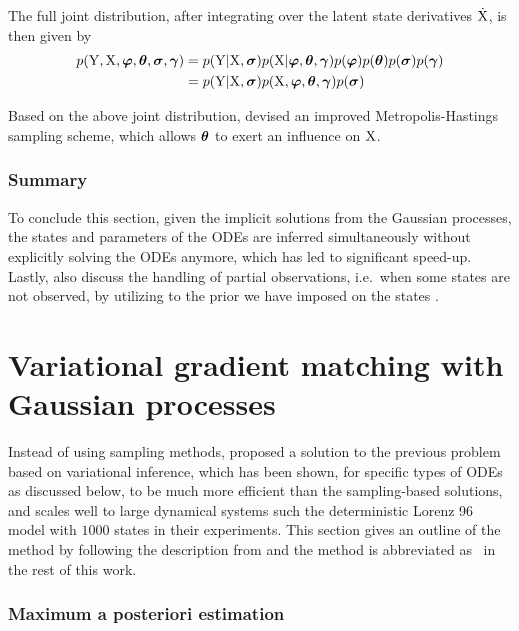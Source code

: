 The full joint distribution, after integrating over the latent state derivatives $\mathrm{\dot{X}}$, is then given by
\begin{align}
    p(\mathrm{Y}, \mathrm{X}, \boldsymbol{\varphi}, \boldsymbol{\theta}, \boldsymbol{\sigma}, \boldsymbol{\gamma})
    & = p(\mathrm{Y}\vert\mathrm{X},\boldsymbol{\sigma}) p(\mathrm{X}|\boldsymbol{\varphi}, \boldsymbol{\theta}, \boldsymbol{\gamma}) p(\boldsymbol{\varphi}) p(\boldsymbol{\theta}) p(\boldsymbol{\sigma}) p(\boldsymbol{\gamma})
    \nonumber
    \\
    & = p(\mathrm{Y}\vert\mathrm{X},\boldsymbol{\sigma}) p(\mathrm{X},\boldsymbol{\varphi},\boldsymbol{\theta},\boldsymbol{\gamma}) p(\boldsymbol{\sigma})    
\end{align}

Based on the above joint distribution, \cite{dondelinger2013ode} devised an improved Metropolis-Hastings sampling scheme, which allows $\boldsymbol{\theta}$ to exert an influence on $\mathrm{X}$.

\subsubsection*{Summary}

To conclude this section, given the implicit solutions from the Gaussian processes, the states and parameters of the ODEs are inferred simultaneously without explicitly solving the ODEs anymore, which has led to significant speed-up.
Lastly, \cite{calderhead2009accelerating} also discuss the handling of partial observations, i.e.\ when some states are not observed, by utilizing to the prior we have imposed on the states .

\section{Variational gradient matching with Gaussian processes}
\label{sec-variational-gradient-matching}

Instead of using sampling methods, \cite{gorbach2016mean, gorbach2017scalable} proposed a solution to the previous problem based on variational inference, which has been shown, for specific types of ODEs  as discussed below, to be much more efficient than the sampling-based solutions, and scales well to large dynamical systems such the deterministic Lorenz 96 model with $1000$ states in their experiments.
This section gives an outline of the method by following the description from \cite{gorbach2017scalable} and the method is abbreviated as \algovgmgp\ in the rest of this work.

\subsubsection*{Maximum a posteriori estimation}

